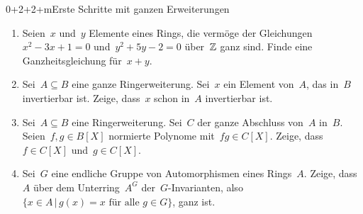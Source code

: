 \documentclass[entwurf]{uebblatt}
\begin{document}
\begin{aufgabe}{0+2+2+m}{Erste Schritte mit ganzen Erweiterungen}
\begin{enumerate}
\item Seien~$x$ und~$y$ Elemente eines Rings, die vermöge der
Gleichungen~$x^2-3x+1=0$ und~$y^2+5y-2=0$ über~$\mathbb{Z}$ ganz sind. Finde eine
Ganzheitsgleichung für~$x+y$.
\item Sei~$A \subseteq B$ eine ganze Ringerweiterung. Sei~$x$ ein Element
von~$A$, das in~$B$ invertierbar ist. Zeige, dass~$x$ schon in~$A$ invertierbar ist.
\item Sei~$A \subseteq B$ eine Ringerweiterung. Sei~$C$ der ganze Abschluss
von~$A$ in~$B$. Seien~$f,g \in B[X]$ normierte Polynome mit~$fg \in C[X]$.
Zeige, dass~$f \in C[X]$ und~$g \in C[X]$.
\item Sei~$G$ eine endliche Gruppe von Automorphismen eines Rings~$A$. Zeige,
dass~$A$ über dem Unterring~$A^G$ der~$G$-Invarianten, also~$\{ x \in A \,|\, \text{$g(x)=x$ für
alle $g \in G$} \}$, ganz ist.
\end{enumerate}
\end{aufgabe}
\end{document}
